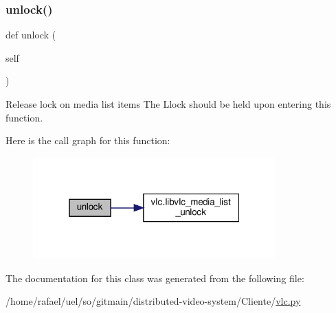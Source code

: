 \subsubsection{\texorpdfstring{unlock()}{unlock()}}
{\footnotesize\ttfamily def unlock (\begin{DoxyParamCaption}\item[{}]{self }\end{DoxyParamCaption})}

\begin{DoxyVerb}Release lock on media list items
The L{lock} should be held upon entering this function.
\end{DoxyVerb}
 Here is the call graph for this function\+:
\nopagebreak
\begin{figure}[H]
\begin{center}
\leavevmode
\includegraphics[width=265pt]{classvlc_1_1_media_list_a3aa5c7a8b194766605bd44948ae9588c_cgraph}
\end{center}
\end{figure}


The documentation for this class was generated from the following file\+:\begin{DoxyCompactItemize}
\item 
/home/rafael/uel/so/gitmain/distributed-\/video-\/system/\+Cliente/\hyperlink{vlc_8py}{vlc.\+py}\end{DoxyCompactItemize}

